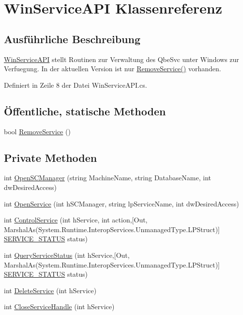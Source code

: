 \hypertarget{classQbeSAS_1_1WinServiceAPI}{
\section{Win\-Service\-API Klassenreferenz}
\label{classQbeSAS_1_1WinServiceAPI}
}


\subsection{Ausf\"{u}hrliche Beschreibung}
\hyperlink{classQbeSAS_1_1WinServiceAPI}{Win\-Service\-API} stellt Routinen zur Verwaltung des Qbe\-Svc unter Windows zur Verfuegung. In der aktuellen Version ist nur \hyperlink{classQbeSAS_1_1WinServiceAPI_QbeSAS_1_1WinServiceAPIe0}{Remove\-Service()} vorhanden. 



Definiert in Zeile 8 der Datei Win\-Service\-API.cs.\subsection*{\"{O}ffentliche, statische Methoden}
\begin{CompactItemize}
\item 
bool \hyperlink{classQbeSAS_1_1WinServiceAPI_QbeSAS_1_1WinServiceAPIe0}{Remove\-Service} ()
\end{CompactItemize}
\subsection*{Private Methoden}
\begin{CompactItemize}
\item 
int \hyperlink{classQbeSAS_1_1WinServiceAPI_QbeSAS_1_1WinServiceAPId0}{Open\-SCManager} (string Machine\-Name, string Database\-Name, int dw\-Desired\-Access)
\item 
int \hyperlink{classQbeSAS_1_1WinServiceAPI_QbeSAS_1_1WinServiceAPId1}{Open\-Service} (int h\-SCManager, string lp\-Service\-Name, int dw\-Desired\-Access)
\item 
int \hyperlink{classQbeSAS_1_1WinServiceAPI_QbeSAS_1_1WinServiceAPId2}{Control\-Service} (int h\-Service, int action,\mbox{[}Out, Marshal\-As(System.Runtime.Interop\-Services.Unmanaged\-Type.LPStruct)\mbox{]} \hyperlink{classQbeSAS_1_1WinServiceAPI_1_1SERVICE__STATUS}{SERVICE\_\-STATUS} status)
\item 
int \hyperlink{classQbeSAS_1_1WinServiceAPI_QbeSAS_1_1WinServiceAPId3}{Query\-Service\-Status} (int h\-Service,\mbox{[}Out, Marshal\-As(System.Runtime.Interop\-Services.Unmanaged\-Type.LPStruct)\mbox{]} \hyperlink{classQbeSAS_1_1WinServiceAPI_1_1SERVICE__STATUS}{SERVICE\_\-STATUS} status)
\item 
int \hyperlink{classQbeSAS_1_1WinServiceAPI_QbeSAS_1_1WinServiceAPId4}{Delete\-Service} (int h\-Service)
\item 
int \hyperlink{classQbeSAS_1_1WinServiceAPI_QbeSAS_1_1WinServiceAPId5}{Close\-Service\-Handle} (int h\-Service)
\end{CompactItemize}


